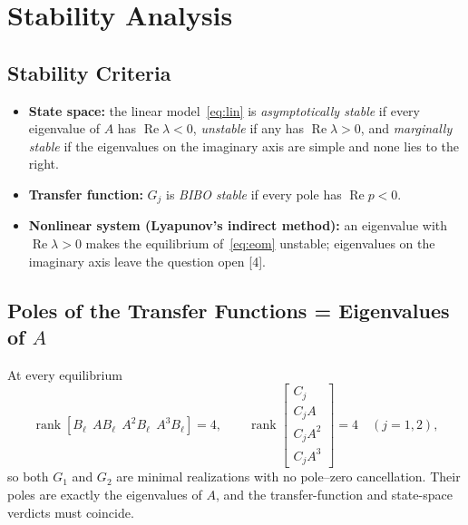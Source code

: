 \documentclass[12pt,a4paper]{article}
\begin{document}
\section{Stability Analysis}\label{sec:stab}
\subsection{Stability Criteria}
\begin{itemize}
\item \textbf{State space:} the linear model~\eqref{eq:lin} is \emph{asymptotically stable} if every eigenvalue of $A$ has $\operatorname{Re}\lambda<0$, \emph{unstable} if any has $\operatorname{Re}\lambda>0$, and \emph{marginally stable} if the eigenvalues on the imaginary axis are simple and none lies to the right.
\item \textbf{Transfer function:} $G_j$ is \emph{BIBO stable} if every pole has $\operatorname{Re}p<0$.
\item \textbf{Nonlinear system (Lyapunov's indirect method):} an eigenvalue with $\operatorname{Re}\lambda>0$ makes the equilibrium of~\eqref{eq:eom} unstable; eigenvalues on the imaginary axis leave the question open [4].
\end{itemize}

\subsection{Poles of the Transfer Functions = Eigenvalues of $A$}
At every equilibrium
\[
\operatorname{rank}[B_\ell\ \ AB_\ell\ \ A^2B_\ell\ \ A^3B_\ell]=4,\qquad
\operatorname{rank}\begin{bmatrix}C_j\\C_jA\\C_jA^2\\C_jA^3\end{bmatrix}=4\quad(j=1,2),
\]
so both $G_1$ and $G_2$ are minimal realizations with no pole--zero cancellation. Their poles are exactly the eigenvalues of $A$, and the transfer-function and state-space verdicts must coincide.
\end{document}
